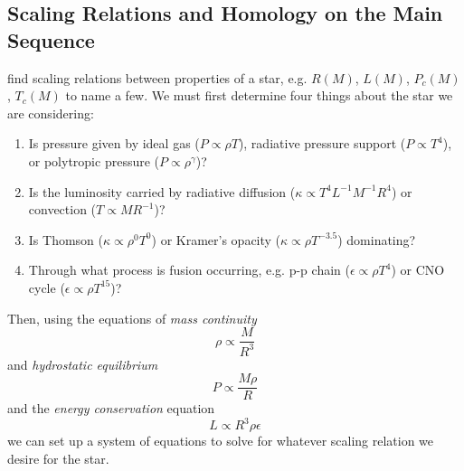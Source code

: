 \subsection{Scaling Relations and Homology on the Main Sequence}\label{sec:scaling_relations}
 find scaling relations between properties of a star,
e.g. $R(M)$, $L(M)$, $P_{c}(M)$, $T_{c}(M)$ to name a few.  We must first determine four
things about the star we are considering:
\begin{enumerate}
	\item Is pressure given by ideal gas ($P \propto \rho T$), radiative pressure support
          ($P \propto T^{4}$), or polytropic pressure ($P\propto\rho^\gamma$)?
	\item Is the luminosity carried by radiative diffusion
          ($\kappa \propto T^{4} L^{-1} M^{-1} R^{4}$) or convection ($T \propto M R^{-1}$)?
	\item Is Thomson ($\kappa \propto \rho^{0} T^{0}$) or Kramer's opacity
          ($\kappa \propto \rho T^{-3.5}$) dominating?
	\item Through what process is fusion occurring, e.g. p-p chain
          ($\epsilon \propto \rho T^{4}$) or CNO cycle ($\epsilon \propto \rho T^{15}$)?
\end{enumerate}
Then, using the equations of \emph{mass continuity}
\begin{equation}
\rho \propto \frac{M}{R^{3}}
\end{equation}
and \emph{hydrostatic equilibrium}
\begin{equation}
P \propto \frac{M \rho}{R}
\end{equation}
and the \emph{energy conservation} equation
\begin{equation}
L \propto R^3 \rho \epsilon
\end{equation}
we can set up a system of equations to solve for whatever scaling relation we desire for the star.

